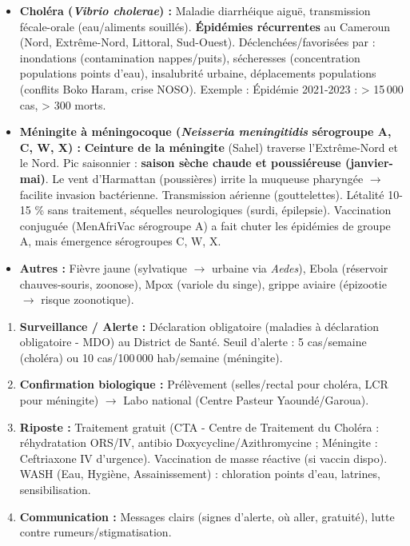\documentclass[11pt]{article}
\begin{document}
\begin{itemize}
    \item \textbf{Choléra (\emph{Vibrio cholerae}) :} Maladie diarrhéique aiguë, transmission fécale-orale (eau/aliments souillés). \textbf{Épidémies récurrentes} au Cameroun (Nord, Extrême-Nord, Littoral, Sud-Ouest). Déclenchées/favorisées par : inondations (contamination nappes/puits), sécheresses (concentration populations points d'eau), insalubrité urbaine, déplacements populations (conflits Boko Haram, crise NOSO). Exemple : Épidémie 2021-2023 : > 15\,000 cas, > 300 morts.
    \item \textbf{Méningite à méningocoque (\emph{Neisseria meningitidis} sérogroupe A, C, W, X) :} \textbf{Ceinture de la méningite} (Sahel) traverse l'Extrême-Nord et le Nord. Pic saisonnier : \textbf{saison sèche chaude et poussiéreuse (janvier-mai)}. Le vent d'Harmattan (poussières) irrite la muqueuse pharyngée $\rightarrow$ facilite invasion bactérienne. Transmission aérienne (gouttelettes). Létalité 10-15 \% sans traitement, séquelles neurologiques (surdi, épilepsie). Vaccination conjuguée (MenAfriVac sérogroupe A) a fait chuter les épidémies de groupe A, mais émergence sérogroupes C, W, X.
    \item \textbf{Autres :} Fièvre jaune (sylvatique $\rightarrow$ urbaine via \emph{Aedes}), Ebola (réservoir chauves-souris, zoonose), Mpox (variole du singe), grippe aviaire (épizootie $\rightarrow$ risque zoonotique).
\end{itemize}

\begin{methode}
\begin{enumerate}
    \item \textbf{Surveillance / Alerte :} Déclaration obligatoire (maladies à déclaration obligatoire - MDO) au District de Santé. Seuil d'alerte : 5 cas/semaine (choléra) ou 10 cas/100\,000 hab/semaine (méningite).
    \item \textbf{Confirmation biologique :} Prélèvement (selles/rectal pour choléra, LCR pour méningite) $\rightarrow$ Labo national (Centre Pasteur Yaoundé/Garoua).
    \item \textbf{Riposte :} Traitement gratuit (CTA - Centre de Traitement du Choléra : réhydratation ORS/IV, antibio Doxycycline/Azithromycine ; Méningite : Ceftriaxone IV d'urgence). Vaccination de masse réactive (si vaccin dispo). WASH (Eau, Hygiène, Assainissement) : chloration points d'eau, latrines, sensibilisation.
    \item \textbf{Communication :} Messages clairs (signes d'alerte, où aller, gratuité), lutte contre rumeurs/stigmatisation.
\end{enumerate}
\end{methode}
\end{document}
